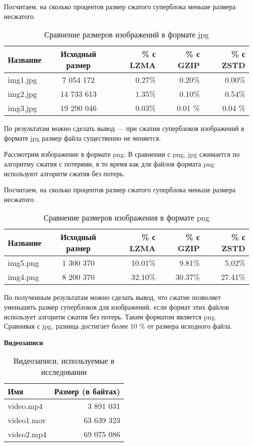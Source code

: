 

Посчитаем, на сколько процентов размер сжатого суперблока меньше размера несжатого.  
\newpage
\begin{table}[h]
\centering
\caption{Сравнение размеров изображений в формате jpg}
\begin{tabular}{|l|c|r|r|r|}
\hline
Название & Исходный размер & \% с LZMA & \% с GZIP & \% с ZSTD \\
\hline
img1.jpg & 7 054 172 & 0.27\% & 0.20\% & 0.00\% \\
\hline
img2.jpg & 14 733 613 & 1.35\% & 0.10\% & 0.54\% \\
\hline
img3.jpg & 19 290 046 & 0.03\% & 0.01 \% & 0.04 \% \\
\hline
\end{tabular}
\end{table}

По результатам можно сделать вывод --- при сжатии суперблоков изображений в формате jpg размер файла существенно не меняется.

Рассмотрим изборажение в формате png. В сравнении с png, jpg сжимается по алгоритму сжатия с потерями, в то время как для файлов формата png используют алгоритм сжатия без потерь.

Посчитаем, на сколько процентов размер сжатого суперблока меньше размера несжатого.   
\begin{table}[h]
\centering
\caption{Сравнение размеров изображения в формате png}
\begin{tabular}{|l|c|r|r|r|}
\hline
Название & Исходный размер & \% с LZMA & \% с GZIP & \% с ZSTD \\
\hline
img5.png & 1 300 370 & 10.01\% & 9.81\% &  5.02\% \\
\hline
img4.png & 8 200 370 & 32.10\% & 30.37\% &  27.41\% \\
\hline
\end{tabular}
\end{table}

По полученным результатам можно сделать вывод, что сжатие позволяет уменьшить размер суперблоков для изображений, если формат этих файлов использует алгоритм сжатия без потерь. Таким форматом является png. Сравнивая с jpg, разница достигает более 10 \% от размера исходного файла.  
\newpage

\textbf{Видеозаписи}

\begin{table}[h]
\centering
\caption{Видеозаписи, используемые в исследовании}
\begin{tabular}{|l|r|}
\hline
Имя & Размер (в байтах) \\
\hline
video.mp4 & 3 891 031 \\
\hline
video1.mov & 63 639 323  \\
\hline
video2.mp4 & 69 075 086 \\
\hline
\end{tabular}
\end{table}

